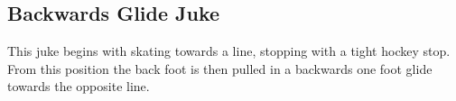 \subsection*{Backwards Glide Juke}

This juke begins with skating towards a line, stopping with a tight hockey stop. 
From this position the back foot is then pulled in a backwards one foot glide towards the opposite line. 
